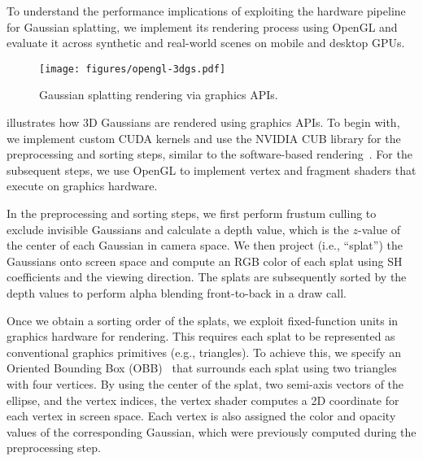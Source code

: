 

To understand the performance implications of exploiting the hardware pipeline
for Gaussian splatting, we implement its rendering process using {OpenGL} and
evaluate it across synthetic and real-world scenes on mobile and desktop GPUs.

\begin{figure}[t]
  \centering
  \texttt{[image: figures/opengl-3dgs.pdf]}
  \caption{Gaussian splatting rendering via graphics APIs.}
  \vspace{-0.20in}
  \label{fig:opengl-3dgs}
\end{figure}

%
 illustrates how 3D Gaussians are rendered using graphics
APIs. To begin with, we implement custom CUDA kernels and use the NVIDIA CUB
library for the preprocessing and sorting steps, similar to the software-based
rendering~\cite{ker:kop23}. For the subsequent steps, we use {OpenGL} to
implement vertex and fragment shaders that execute on graphics hardware.

In the preprocessing and sorting steps, we first perform frustum culling to
exclude invisible Gaussians and calculate a depth value, which is the $z$-value
of the center of each Gaussian in camera space. We then project (i.e.,
``splat'') the Gaussians onto screen space and compute an RGB color of each
splat using SH coefficients and the viewing direction.
%
The splats are subsequently sorted by the depth values to perform alpha
blending front-to-back in a draw call.

Once we obtain a sorting order of the splats, we exploit fixed-function units
in graphics hardware for rendering. This requires each splat to be represented
as conventional graphics primitives (e.g., triangles). To achieve this, we
specify an Oriented Bounding Box (OBB)~\cite{got:lin96} that surrounds each
splat using two triangles with four vertices.
%
By using the center of the splat, two semi-axis vectors of the ellipse, and the
vertex indices, the vertex shader computes a 2D coordinate for each vertex in
screen space. Each vertex is also assigned the color and opacity values of the
corresponding Gaussian, which were previously computed during the preprocessing
step. 

